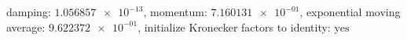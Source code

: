 damping: $\num[scientific-notation=true]{1.056857e-13}$, momentum: $\num[scientific-notation=true]{7.160131e-01}$, exponential moving average: $\num[scientific-notation=true]{9.622372e-01}$, initialize Kronecker factors to identity: $\text{yes}$